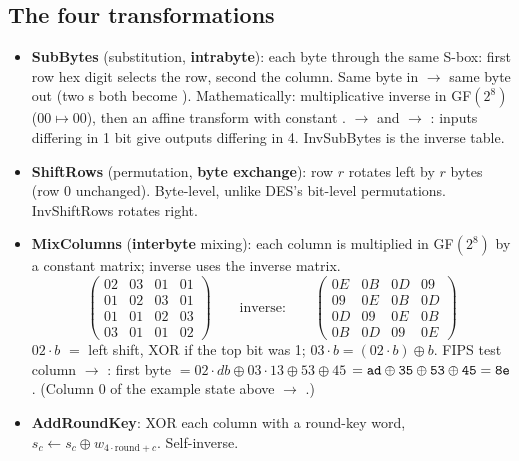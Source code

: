 \subsection{The four transformations}
\begin{itemize}
  \item \textbf{SubBytes} (substitution, \textbf{intrabyte}): each byte through the same S-box: first row hex digit selects the row, second the column. Same byte in $\to$ same byte out (two s both become ). Mathematically: multiplicative inverse in GF$(2^8)$ ($00 \mapsto 00$), then an affine transform with constant .  $\to$  and  $\to$ : inputs differing in 1 bit give outputs differing in 4. InvSubBytes is the inverse table.
  \item \textbf{ShiftRows} (permutation, \textbf{byte exchange}): row $r$ rotates left by $r$ bytes (row 0 unchanged). Byte-level, unlike DES's bit-level permutations. InvShiftRows rotates right.
  \item \textbf{MixColumns} (\textbf{interbyte} mixing): each column is multiplied in GF$(2^8)$ by a constant matrix; inverse uses the inverse matrix.
  \[
  \begin{pmatrix}02&03&01&01\\01&02&03&01\\01&01&02&03\\03&01&01&02\end{pmatrix}
  \qquad\text{inverse:}\qquad
  \begin{pmatrix}0E&0B&0D&09\\09&0E&0B&0D\\0D&09&0E&0B\\0B&0D&09&0E\end{pmatrix}
  \]
  $02 \cdot b$ $=$ left shift, XOR  if the top bit was 1; \;$03 \cdot b = (02 \cdot b) \oplus b$. FIPS test column  $\to$ : first byte $= 02{\cdot}db \oplus 03{\cdot}13 \oplus 53 \oplus 45$ $= \texttt{ad} \oplus \texttt{35} \oplus \texttt{53} \oplus \texttt{45} = \texttt{8e}$. (Column 0 of the example state above $\to$ .)
  \item \textbf{AddRoundKey}: XOR each column with a round-key word, $s_c \leftarrow s_c \oplus w_{4\cdot\text{round} + c}$. Self-inverse.
\end{itemize}

